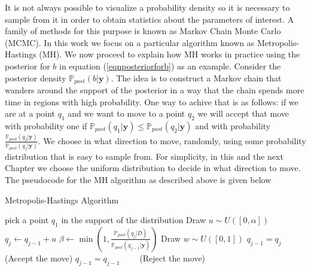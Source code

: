 \documentclass{sfuthesis}
\newcommand{\post}{\mathbb{P}_{post}}
\newcommand{\y}{\textbf{y}}
\begin{document}
It is not always possible to visualize a probability density so it is necessary to sample from it
in order to obtain statistics about the parameters of interest.
A family of methods for this purpose
is known as Markov Chain Monte Carlo (MCMC). In this work we 
focus on a particular algorithm known as Metropolis-Hastings  (MH). We now proceed  to explain
how MH works in practice using the posterior for $b$ in equation (\ref{eqnposteriorforb}) as an example. 
\newline
\newline
Consider the posterior density $\post(b|\y)$. The idea is to construct a Markov chain that wanders 
around the support of the posterior
in a way that the chain spends more time in regions with high probability.
One way to achive that is as follows: if we are at a point $q_{1}$ and we want to move to a point $q_{2}$ 
we will accept 
that move with probability one if $\post(q_{1}|\y)\leq\post(q_{2}|\y)$ and with probability 
$\frac{\post(q_{2}|\y)}{\post(q_{1}|\y)}$.  We choose
in what direction to move, randomly, using some probability distribution that is easy to sample from.
For simplicity, in this and the next Chapter we choose the uniform distribution to decide in what  direction to move.
The pseudocode  for the MH algorithm as described above is given below  \cite{Somersalo}

\begin{algorithm}\label{algMH}
\caption{Metropolis-Hastings Algorithm}
\begin{algorithmic}[1]\label{algMH}
\State pick a point $q_{1}$ in the support of the distribution
\State Draw $u\sim U([0,\alpha])$
\State $q_{j}\leftarrow q_{j-1}+u$
\State $\beta\leftarrow\min(1,\frac{\post(q_{j}|D)}{\post(q_{j-1}|\y)})$
\State Draw $w\sim U([0,1])$
\State $q_{j-1}=q_{j}\qquad$   (Accept the move)
\Else
\State $q_{j-1}=q_{j-1}\qquad$ (Reject the move)
\EndIf
\EndFor
\end{algorithmic}
\end{algorithm}
\end{document}
